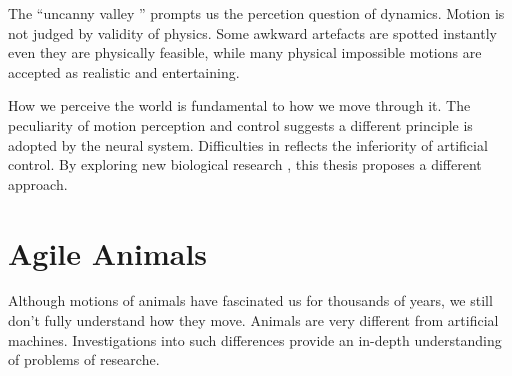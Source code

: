 The ``uncanny valley '' prompts us the percetion question of dynamics.
Motion is not judged by validity of physics.
Some awkward artefacts are spotted instantly even they are physically feasible, while many physical impossible motions are accepted as realistic and entertaining. 

How we perceive the world is fundamental to how we move through it.
The peculiarity of motion perception and control suggests a different principle is adopted by the neural system.
Difficulties in \cms reflects the inferiority of artificial control.
By exploring new biological research , this thesis proposes a different approach.

 

\section{Agile Animals}
Although motions of animals have fascinated us for thousands of years, we still don't fully understand how they move.
Animals are very different from artificial machines.
Investigations into such differences provide an in-depth understanding of problems of \cms researche.

